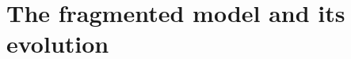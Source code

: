 \documentclass[a4paper,11pt,twoside,openright]{book}
\begin{document}
    \frontmatter
    
    \pagestyle{empty}
    
    
     \dominitoc
    
    \pagestyle{front}

	
    \tableofcontents
    
    \mainmatter
    

%
%    
    
    
    
    
    
    \part{The fragmented model and its evolution}
    
    
       
%     
    
    	
           
    
%    
%    
%    
%    
%    
%    
%    
%    
%    
%    
%    
%    
%    
    
%    
    
    \pagestyle{introduction}
    \label{Biblio}
    
    
    
    \backmatter
    \listoffigures
    \listoftables
%     
\end{document}
